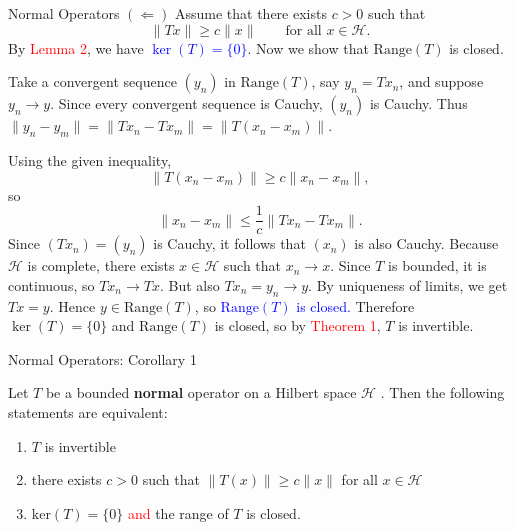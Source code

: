 \documentclass[9pt, aspectratio=169]{beamer}
\begin{document}
\begin{frame}{Normal Operators}
$(\Leftarrow)$ Assume that there exists $c>0$ such that
\[
\|Tx\|\ge c\|x\| \qquad \text{for all } x\in\mathcal{H}.
\]
By \textcolor{red}{Lemma 2}, we have \textcolor{blue}{$\ker(T)=\{0\}$}. Now we show that $\mathrm{Range}(T)$ is closed.

Take a convergent sequence $(y_n)$ in $\mathrm{Range}(T)$, say $y_n=Tx_n$, and suppose $y_n\to y$. Since every convergent sequence is Cauchy, $(y_n)$ is Cauchy. Thus
$
\|y_n-y_m\|=\|Tx_n-Tx_m\|=\|T(x_n-x_m)\|.
$

Using the given inequality,
\[
\|T(x_n-x_m)\|\ge c\|x_n-x_m\|,
\]
so
\[
\|x_n-x_m\|\le \frac{1}{c}\|Tx_n-Tx_m\|.
\]
Since $(Tx_n)=(y_n)$ is Cauchy, it follows that $(x_n)$ is also Cauchy. Because $\mathcal{H}$ is complete, there exists $x\in\mathcal{H}$ such that $x_n\to x$. Since $T$ is bounded, it is continuous, so
$
Tx_n\to Tx.
$
But also $Tx_n=y_n\to y$. By uniqueness of limits, we get
$
Tx=y.
$
Hence $y\in \mathrm{Range}(T)$, so \textcolor{blue}{$\mathrm{Range}(T)$ is closed.}
Therefore $\ker(T)=\{0\}$ and $\mathrm{Range}(T)$ is closed, so by \textcolor{red}{Theorem 1}, $T$ is invertible.  \square 
 

\end{frame}
\begin{frame}{Normal Operators: Corollary 1}
    \begin{tcolorbox}[colback=blue!5, colframe=blue!50!red, title= Corollary 1]
 Let $T$ be a bounded \textbf{normal} operator on a Hilbert space $\mathcal{H}$ . Then the following statements are equivalent:
 \begin{enumerate}
     \item $T$ is invertible 
     \pause
     \item there exists $c>0$ such that $\|T(x)\|\ge c \|x\|$ for all $x \in \mathcal{H}$
     \pause
     \item $\mathrm{ker}(T)=\{0 \}$ \textcolor{red}{and} the range of $T$ is closed.\end{enumerate}
\end{tcolorbox} 
\end{frame}
\end{document}
